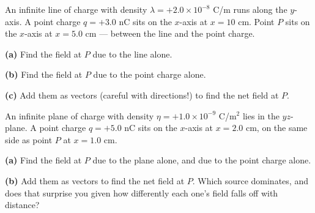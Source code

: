 \documentclass[12pt]{article}
\begin{document}

\clearpage

\prob An infinite line of charge with density $\lambda=+2.0\times10^{-8}$ C/m runs
along the $y$-axis. A point charge $q=+3.0$ nC sits on the $x$-axis at $x=10$ cm.
Point $P$ sits on the $x$-axis at $x=5.0$ cm --- between the line and the point
charge.

\begin{center}
\end{center}

\textbf{(a)} Find the field at $P$ due to the line alone.


\textbf{(b)} Find the field at $P$ due to the point charge alone.


\textbf{(c)} Add them as vectors (careful with directions!) to find the net field at
$P$.


\prob An infinite plane of charge with density $\eta=+1.0\times10^{-9}$ C/m$^2$ lies
in the $yz$-plane. A point charge $q=+5.0$ nC sits on the $x$-axis at $x=2.0$ cm, on
the same side as point $P$ at $x=1.0$ cm.

\textbf{(a)} Find the field at $P$ due to the plane alone, and due to the point
charge alone.


\textbf{(b)} Add them as vectors to find the net field at $P$. Which source
dominates, and does that surprise you given how differently each one's field falls
off with distance?

\end{document}
